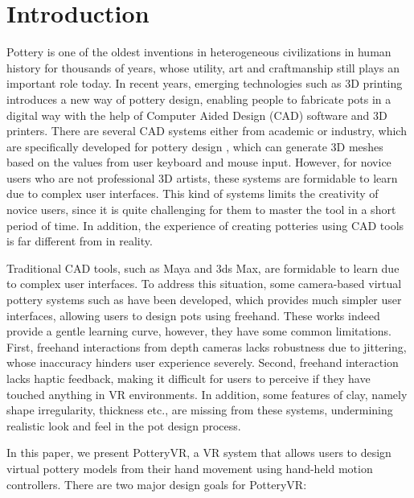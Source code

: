\section{Introduction}
\label{sec:1}
Pottery is one of the oldest inventions in heterogeneous civilizations in human history for thousands of years, whose utility, art and craftmanship still plays an important role today.
In recent years, emerging technologies such as 3D printing introduces a new way of pottery design, enabling people to fabricate pots in a digital way with the help of Computer Aided Design (CAD) software and 3D printers.
There are several CAD systems either from academic or industry, which are specifically developed for pottery design \cite{koutsoudis2009qp,kumar2011wheel}, which can generate 3D meshes based on the values from user keyboard and mouse input.
However, for novice users who are not professional 3D artists, these systems are formidable to learn due to complex user interfaces. 
This kind of systems limits the creativity of novice users, since it is quite challenging for them to master the tool in a short period of time.
In addition, the experience of creating potteries using CAD tools is far different from in reality.

Traditional CAD tools, such as Maya\cite{website:maya} and 3ds Max\cite{website:3dmax}, are formidable to learn due to complex user interfaces.
To address this situation, some camera-based virtual pottery systems such as \cite{ramani2015gesture,murugappan2013handy,han2014virtual} have been developed, which provides much simpler user interfaces, allowing users to design pots using freehand.
These works indeed provide a gentle learning curve, however, they have some common limitations.
First, freehand interactions from depth cameras lacks robustness due to jittering, whose inaccuracy hinders user experience severely.
Second, freehand interaction lacks haptic feedback, making it difficult for users to perceive if they have touched anything in VR environments.
In addition, some features of clay, namely shape irregularity, thickness etc., are missing from these systems, undermining realistic look and feel in the pot design process.

In this paper, we present PotteryVR, a VR system that allows users to design virtual pottery models from their hand movement using hand-held motion controllers. There are two major design goals for PotteryVR:

